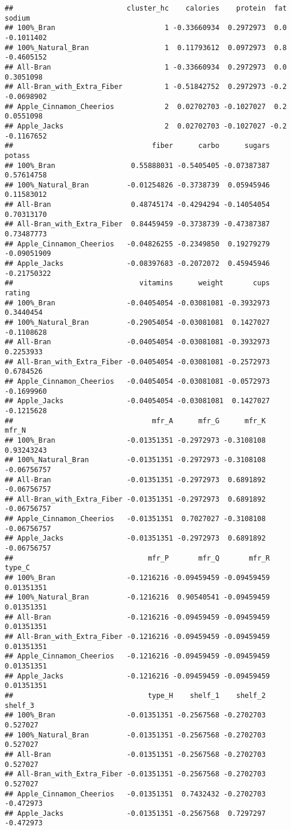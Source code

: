 \documentclass[
]{article}
\begin{document}
\begin{verbatim}
##                           cluster_hc    calories    protein  fat     sodium
## 100%_Bran                          1 -0.33660934  0.2972973  0.0 -0.1011402
## 100%_Natural_Bran                  1  0.11793612  0.0972973  0.8 -0.4605152
## All-Bran                           1 -0.33660934  0.2972973  0.0  0.3051098
## All-Bran_with_Extra_Fiber          1 -0.51842752  0.2972973 -0.2 -0.0698902
## Apple_Cinnamon_Cheerios            2  0.02702703 -0.1027027  0.2  0.0551098
## Apple_Jacks                        2  0.02702703 -0.1027027 -0.2 -0.1167652
##                                 fiber      carbo      sugars      potass
## 100%_Bran                  0.55888031 -0.5405405 -0.07387387  0.57614758
## 100%_Natural_Bran         -0.01254826 -0.3738739  0.05945946  0.11583012
## All-Bran                   0.48745174 -0.4294294 -0.14054054  0.70313170
## All-Bran_with_Extra_Fiber  0.84459459 -0.3738739 -0.47387387  0.73487773
## Apple_Cinnamon_Cheerios   -0.04826255 -0.2349850  0.19279279 -0.09051909
## Apple_Jacks               -0.08397683 -0.2072072  0.45945946 -0.21750322
##                              vitamins      weight       cups     rating
## 100%_Bran                 -0.04054054 -0.03081081 -0.3932973  0.3440454
## 100%_Natural_Bran         -0.29054054 -0.03081081  0.1427027 -0.1108628
## All-Bran                  -0.04054054 -0.03081081 -0.3932973  0.2253933
## All-Bran_with_Extra_Fiber -0.04054054 -0.03081081 -0.2572973  0.6784526
## Apple_Cinnamon_Cheerios   -0.04054054 -0.03081081 -0.0572973 -0.1699960
## Apple_Jacks               -0.04054054 -0.03081081  0.1427027 -0.1215628
##                                 mfr_A      mfr_G      mfr_K       mfr_N
## 100%_Bran                 -0.01351351 -0.2972973 -0.3108108  0.93243243
## 100%_Natural_Bran         -0.01351351 -0.2972973 -0.3108108 -0.06756757
## All-Bran                  -0.01351351 -0.2972973  0.6891892 -0.06756757
## All-Bran_with_Extra_Fiber -0.01351351 -0.2972973  0.6891892 -0.06756757
## Apple_Cinnamon_Cheerios   -0.01351351  0.7027027 -0.3108108 -0.06756757
## Apple_Jacks               -0.01351351 -0.2972973  0.6891892 -0.06756757
##                                mfr_P       mfr_Q       mfr_R     type_C
## 100%_Bran                 -0.1216216 -0.09459459 -0.09459459 0.01351351
## 100%_Natural_Bran         -0.1216216  0.90540541 -0.09459459 0.01351351
## All-Bran                  -0.1216216 -0.09459459 -0.09459459 0.01351351
## All-Bran_with_Extra_Fiber -0.1216216 -0.09459459 -0.09459459 0.01351351
## Apple_Cinnamon_Cheerios   -0.1216216 -0.09459459 -0.09459459 0.01351351
## Apple_Jacks               -0.1216216 -0.09459459 -0.09459459 0.01351351
##                                type_H    shelf_1    shelf_2   shelf_3
## 100%_Bran                 -0.01351351 -0.2567568 -0.2702703  0.527027
## 100%_Natural_Bran         -0.01351351 -0.2567568 -0.2702703  0.527027
## All-Bran                  -0.01351351 -0.2567568 -0.2702703  0.527027
## All-Bran_with_Extra_Fiber -0.01351351 -0.2567568 -0.2702703  0.527027
## Apple_Cinnamon_Cheerios   -0.01351351  0.7432432 -0.2702703 -0.472973
## Apple_Jacks               -0.01351351 -0.2567568  0.7297297 -0.472973
\end{verbatim}
\end{document}
